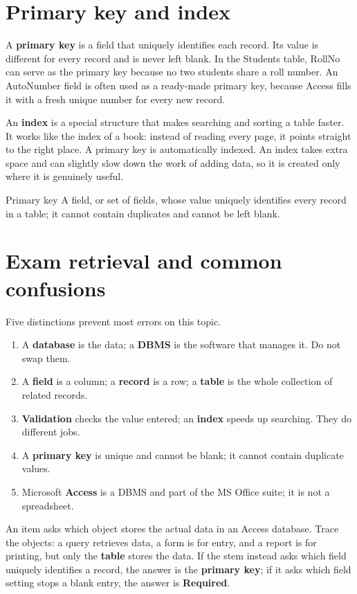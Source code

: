 \section{Primary key and index}
A \textbf{primary key} is a field that uniquely identifies each record. Its
value is different for every record and is never left blank. In the Students
table, RollNo can serve as the primary key because no two students share a
roll number. An AutoNumber field is often used as a ready-made primary key,
because Access fills it with a fresh unique number for every new record.

An \textbf{index} is a special structure that makes searching and sorting a
table faster. It works like the index of a book: instead of reading every
page, it points straight to the right place. A primary key is automatically
indexed. An index takes extra space and can slightly slow down the work of
adding data, so it is created only where it is genuinely useful.

\begin{definitionbox}{Primary key}
A field, or set of fields, whose value uniquely identifies every record in a
table; it cannot contain duplicates and cannot be left blank.
\end{definitionbox}

\section{Exam retrieval and common confusions}
Five distinctions prevent most errors on this topic.
\begin{enumerate}
  \item A \textbf{database} is the data; a \textbf{DBMS} is the software that
    manages it. Do not swap them.
  \item A \textbf{field} is a column; a \textbf{record} is a row; a
    \textbf{table} is the whole collection of related records.
  \item \textbf{Validation} checks the value entered; an \textbf{index}
    speeds up searching. They do different jobs.
  \item A \textbf{primary key} is unique and cannot be blank; it cannot
    contain duplicate values.
  \item Microsoft \textbf{Access} is a DBMS and part of the MS Office suite;
    it is not a spreadsheet.
\end{enumerate}

\begin{example}
An item asks which object stores the actual data in an Access database.
Trace the objects: a query retrieves data, a form is for entry, and a report
is for printing, but only the \textbf{table} stores the data. If the stem
instead asks which field uniquely identifies a record, the answer is the
\textbf{primary key}; if it asks which field setting stops a blank entry, the
answer is \textbf{Required}.
\end{example}

